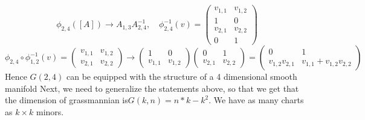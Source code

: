 \documentclass[11pt,a4paper]{report}
\begin{document}
$$ \phi_{2,4}([A]) \to A_{1,3} A_{2,4}^{-1}, \quad \phi_{2,4}^{-1}(v) = 
\begin{pmatrix}
v_{1,1} & v_{1,2} \\
1 & 0 \\
v_{2,1} & v_{2,2} \\
0 & 1
\end{pmatrix}
$$
$$ \phi_{2,4} \circ \phi_{1,2}^{-1}(v) = 
\begin{pmatrix}
v_{1,1} & v_{1,2} \\
v_{2,1} & v_{2,2}
\end{pmatrix} \to 
\begin{pmatrix}
    1 & 0 \\
    v_{1,1} & v_{1,2}
\end{pmatrix}
\begin{pmatrix}
    0 & 1 \\
    v_{2,1} & v_{2,2}
\end{pmatrix}
= \begin{pmatrix}
    0 & 1 \\
    v_{1,2} v_{2,1} & v_{1,1} + v_{1,2} v_{2,2}
    \end{pmatrix}
$$
Hence $G(2,4)$ can be equipped with the structure of a 4 dimensional smooth manifold
\newline
Next, we need to generalize the statements above, so that we get that the dimension of grassmannian is$ G(k,n) = n*k-k^2$.
We have as many charts as $k \times k$ minors.
\setcounter{tocdepth}{1} 

 
\end{document}

